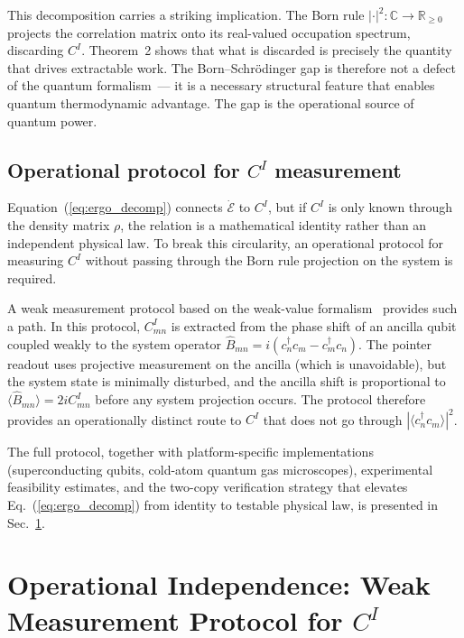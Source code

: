\documentclass[aps,pra,preprint,groupedaddress,amsmath,amssymb,floatfix]{revtex4-2}
\begin{document}
This decomposition carries a striking implication. The Born rule $|\cdot|^2 : \mathbb{C} \to \mathbb{R}_{\ge 0}$ projects the correlation matrix onto its real-valued occupation spectrum, discarding $C^I$. Theorem~2 shows that what is discarded is precisely the quantity that drives extractable work. The Born--Schr\"odinger gap is therefore not a defect of the quantum formalism~--- it is a necessary structural feature that enables quantum thermodynamic advantage. The gap is the operational source of quantum power.

\subsection{Operational protocol for $C^I$ measurement}
\label{sec:th2_protocol}

Equation~(\ref{eq:ergo_decomp}) connects $\dot{\mathcal{E}}$ to $C^I$, but if $C^I$ is only known through the density matrix $\rho$, the relation is a mathematical identity rather than an independent physical law. To break this circularity, an operational protocol for measuring $C^I$ without passing through the Born rule projection on the system is required.

A weak measurement protocol based on the weak-value formalism~\cite{dressel2014} provides such a path. In this protocol, $C^I_{mn}$ is extracted from the phase shift of an ancilla qubit coupled weakly to the system operator $\hat{B}_{mn} = i(c^\dagger_n c_m - c^\dagger_m c_n)$. The pointer readout uses projective measurement on the ancilla (which is unavoidable), but the system state is minimally disturbed, and the ancilla shift is proportional to $\langle \hat{B}_{mn} \rangle = 2i C^I_{mn}$ before any system projection occurs. The protocol therefore provides an operationally distinct route to $C^I$ that does not go through $|\langle c^\dagger_n c_m \rangle|^2$.

The full protocol, together with platform-specific implementations (superconducting qubits, cold-atom quantum gas microscopes), experimental feasibility estimates, and the two-copy verification strategy that elevates Eq.~(\ref{eq:ergo_decomp}) from identity to testable physical law, is presented in Sec.~\ref{sec:weakmeasurement}.

\section{Operational Independence: Weak Measurement Protocol for $C^I$}
\label{sec:weakmeasurement}
\end{document}
